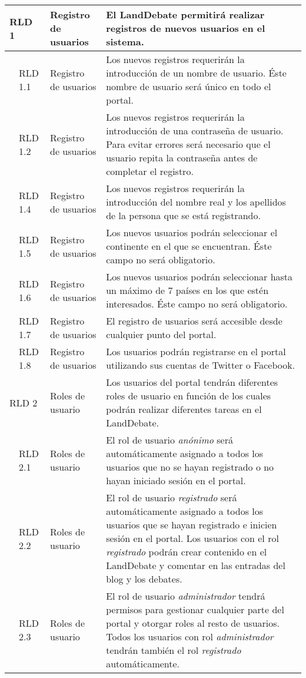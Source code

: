 \begin{longtable}[c]{|p{1mm}|p{14mm}|p{30mm}|p{90mm}|}
\multicolumn{2}{|l|}{RLD 1} & Registro de usuarios & El LandDebate permitirá realizar registros de nuevos usuarios en el sistema. \\
\hline
& RLD 1.1 & Registro de usuarios & Los nuevos registros requerirán la introducción de un nombre de usuario.  Éste nombre de usuario será único en todo el portal. \\
\hline
& RLD 1.2 & Registro de usuarios & Los nuevos registros requerirán la introducción de una contraseña de usuario.  Para evitar errores será necesario que el usuario repita la contraseña antes de completar el registro. \\
\hline
& RLD 1.4 & Registro de usuarios & Los nuevos registros requerirán la introducción del nombre real y los apellidos de la persona que se está registrando. \\
\hline
& RLD 1.5 & Registro de usuarios & Los nuevos usuarios podrán seleccionar el continente en el que se encuentran.  Éste campo no será obligatorio. \\
\hline
& RLD 1.6 & Registro de usuarios & Los nuevos usuarios podrán seleccionar hasta un máximo de 7 países en los que estén interesados.  Éste campo no será obligatorio. \\
\hline
& RLD 1.7 & Registro de usuarios & El registro de usuarios será accesible desde cualquier punto del portal. \\
\hline
& RLD 1.8 & Registro de usuarios & Los usuarios podrán registrarse en el portal utilizando sus cuentas de Twitter o Facebook. \\
\hline
\multicolumn{2}{|l|}{RLD 2} & Roles de usuario & Los usuarios del portal tendrán diferentes roles de usuario en función de los cuales podrán realizar diferentes tareas en el LandDebate. \\
\hline
& RLD 2.1 & Roles de usuario & El rol de usuario \textit{anónimo} será automáticamente asignado a todos los usuarios que no se hayan registrado o no hayan iniciado sesión en el portal. \\
\hline
& RLD 2.2 & Roles de usuario & El rol de usuario \textit{registrado} será automáticamente asignado a todos los usuarios que se hayan registrado e inicien sesión en el portal. Los usuarios con el rol \textit{registrado} podrán crear contenido en el LandDebate y comentar en las entradas del blog y los debates.\\
\hline
& RLD 2.3 & Roles de usuario & El rol de usuario \textit{administrador} tendrá permisos para gestionar cualquier parte del portal y otorgar roles al resto de usuarios. Todos los usuarios con rol \textit{administrador} tendrán también el rol \textit{registrado} automáticamente. \\

\end{longtable}
